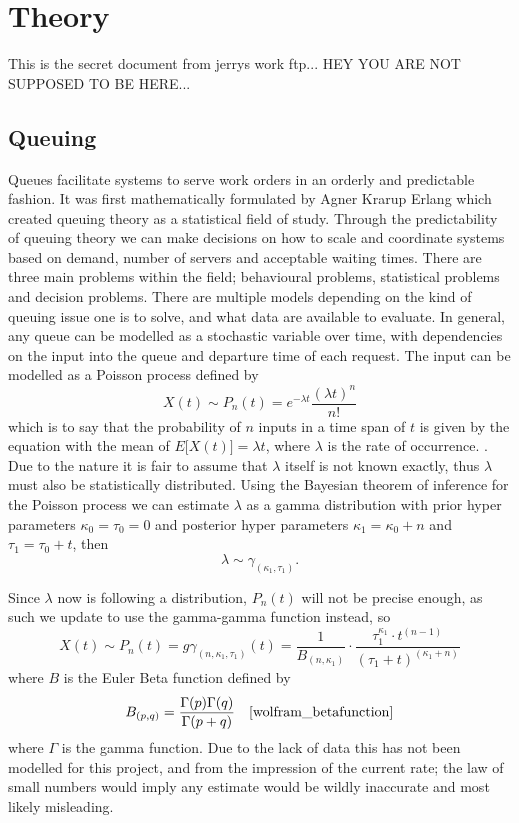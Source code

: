 \documentclass[../main.tex]{subfiles}
\begin{document}
\renewcommand{\baselinestretch}{1.5}

\chapter{Theory}
This is the secret document from jerrys work ftp... HEY YOU ARE NOT SUPPOSED TO BE HERE...

\section{Queuing}
Queues facilitate systems to serve work orders in an orderly and predictable fashion. It was first mathematically formulated by Agner Krarup Erlang which created queuing theory as a statistical field of study. Through the predictability of queuing theory we can make decisions on how to scale and coordinate systems based on demand, number of servers and acceptable waiting times. There are three main problems within the field; behavioural problems, statistical problems and decision problems. There are multiple models depending on the kind of queuing issue one is to solve, and what data are available to evaluate. In general, any queue can be modelled as a stochastic variable over time, with dependencies on the input into the queue and departure time of each request.\cite{simple_markovian_queuing} The input can be modelled as a Poisson process defined by
\[
    X(t)\sim P_n(t) = e^{-\lambda t}\frac{(\lambda t)^n}{n!}
\]
which is to say that the probability of $n$ inputs in a time span of $t$ is given by the equation with the mean of $E\lbrack X(t)\rbrack = \lambda t$, where $\lambda$ is the rate of occurrence. \cite{simple_markovian_queuing}. Due to the nature it is fair to assume that $\lambda$ itself is not known exactly, thus $\lambda$ must also be statistically distributed. Using the Bayesian theorem of inference for the Poisson process we can estimate $\lambda$ as a gamma distribution with prior hyper parameters $\kappa_0 = \tau_0 = 0$ and posterior hyper parameters $\kappa_1 = \kappa_0 + n$ and $\tau_1 = \tau_0 + t$, then
\[
    \lambda\sim\gamma_{(\kappa_1,\tau_1)}.
\]

Since $\lambda$ now is following a distribution, $P_n(t)$ will not be precise enough, as such we update to use the gamma-gamma function instead, so
\[
    X(t)\sim P_n(t) = g\gamma_{(n, \kappa_1,\tau_1)}(t) = \frac{1}{B_{(n,\kappa_1)}}\cdot\frac{\tau_1^{\kappa_1}\cdot t^{(n-1)}}{(\tau_1+t)^{(\kappa_1+n)}}
\]
where $B$ is the Euler Beta function defined by
\[
    B_{(p,q)} = \frac{\Gamma(p)\Gamma(q)}{\Gamma(p+q)} \quad\text{\cite{wolfram_betafunction}}
\]
 where $\Gamma$ is the gamma function. \cite{nyberd_statistikk}
Due to the lack of data this has not been modelled for this project, and from the impression of the current rate; the law of small numbers would imply any estimate would be wildly inaccurate and most likely misleading.
\end{document}
